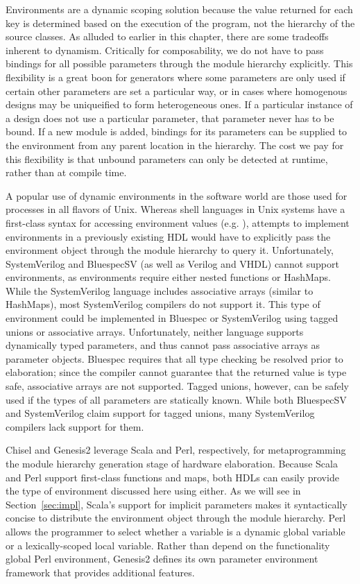 Environments are a dynamic scoping solution because the value returned for each key is determined based on the execution of the program,
not the hierarchy of the source classes.
As alluded to earlier in this chapter, there are some tradeoffs inherent to dynamism.
Critically for composability, we do not have to pass bindings for all possible parameters through the module hierarchy explicitly.
This flexibility is a great boon for generators where some parameters are only used if certain other parameters are set a particular way,
or in cases where homogenous designs may be uniqueified to form heterogeneous ones.
If a particular instance of a design does not use a particular parameter, that parameter never has to be bound.
If a new module is added, bindings for its parameters can be supplied to the environment from any parent location in the hierarchy.
The cost we pay for this flexibility is that unbound parameters can only be detected at runtime, rather than at compile time.

A popular use of dynamic environments in the software world are those used for processes in all flavors of Unix.
Whereas shell languages in Unix systems have a first-class syntax for accessing environment values (e.g. ),
attempts to implement environments in a previously existing HDL would have to explicitly pass the environment object through the module hierarchy to query it.
Unfortunately, SystemVerilog and BluespecSV (as well as Verilog and VHDL) cannot support environments, as environments require either nested functions or HashMaps.
While the SystemVerilog language includes associative arrays (similar to HashMaps), most SystemVerilog compilers do not support it.
This type of environment could be implemented in Bluespec or SystemVerilog using tagged unions or associative arrays.
Unfortunately, neither language supports dynamically typed parameters, and thus cannot pass associative arrays as parameter objects.
Bluespec requires that all type checking be resolved prior to elaboration; since the compiler cannot guarantee that the returned value is type safe, associative arrays are not supported. 
Tagged unions, however, can be safely used if the types of all parameters are statically known.
While both BluespecSV and SystemVerilog claim support for tagged unions, many SystemVerilog compilers lack support for them.

Chisel and Genesis2 leverage Scala and Perl, respectively, for metaprogramming the module hierarchy generation stage of hardware elaboration.
Because Scala and Perl support first-class functions and maps, both HDLs can easily provide the type of environment discussed here using either.
As we will see in Section~\ref{sec:impl}, Scala's support for implicit parameters makes it syntactically concise to distribute
the environment object through the module hierarchy.
Perl allows the programmer to select whether a variable is a dynamic global variable or a lexically-scoped local variable.
Rather than depend on the functionality global Perl environment, Genesis2 defines its own parameter environment framework that provides additional features.

